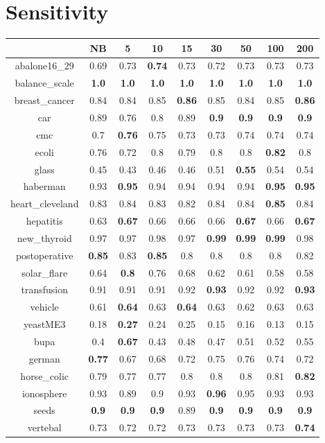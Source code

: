 \documentclass{article}%
\begin{document}
%
\section*{Sensitivity}%
\begin{tabular}{c|cccccccc}%
\hline%
&NB&5&10&15&30&50&100&200\\%
\hline%
abalone16\_29&0.69&0.73&\textbf{0.74}&0.73&0.72&0.73&0.73&0.73\\%
\hline%
balance\_scale&\textbf{1.0}&\textbf{1.0}&\textbf{1.0}&\textbf{1.0}&\textbf{1.0}&\textbf{1.0}&\textbf{1.0}&\textbf{1.0}\\%
\hline%
breast\_cancer&0.84&0.84&0.85&\textbf{0.86}&0.85&0.84&0.85&\textbf{0.86}\\%
\hline%
car&0.89&0.76&0.8&0.89&\textbf{0.9}&\textbf{0.9}&\textbf{0.9}&\textbf{0.9}\\%
\hline%
cmc&0.7&\textbf{0.76}&0.75&0.73&0.73&0.74&0.74&0.74\\%
\hline%
ecoli&0.76&0.72&0.8&0.79&0.8&0.8&\textbf{0.82}&0.8\\%
\hline%
glass&0.45&0.43&0.46&0.46&0.51&\textbf{0.55}&0.54&0.54\\%
\hline%
haberman&0.93&\textbf{0.95}&0.94&0.94&0.94&0.94&\textbf{0.95}&\textbf{0.95}\\%
\hline%
heart\_cleveland&0.83&0.84&0.83&0.82&0.84&0.84&\textbf{0.85}&0.84\\%
\hline%
hepatitis&0.63&\textbf{0.67}&0.66&0.66&0.66&\textbf{0.67}&0.66&\textbf{0.67}\\%
\hline%
new\_thyroid&0.97&0.97&0.98&0.97&\textbf{0.99}&\textbf{0.99}&\textbf{0.99}&0.98\\%
\hline%
postoperative&\textbf{0.85}&0.83&\textbf{0.85}&0.8&0.8&0.8&0.8&0.82\\%
\hline%
solar\_flare&0.64&\textbf{0.8}&0.76&0.68&0.62&0.61&0.58&0.58\\%
\hline%
transfusion&0.91&0.91&0.91&0.92&\textbf{0.93}&0.92&0.92&\textbf{0.93}\\%
\hline%
vehicle&0.61&\textbf{0.64}&0.63&\textbf{0.64}&0.63&0.62&0.63&0.63\\%
\hline%
yeastME3&0.18&\textbf{0.27}&0.24&0.25&0.15&0.16&0.13&0.15\\%
\hline%
bupa&0.4&\textbf{0.67}&0.43&0.48&0.47&0.51&0.52&0.55\\%
\hline%
german&\textbf{0.77}&0.67&0.68&0.72&0.75&0.76&0.74&0.72\\%
\hline%
horse\_colic&0.79&0.77&0.77&0.8&0.8&0.8&0.81&\textbf{0.82}\\%
\hline%
ionosphere&0.93&0.89&0.9&0.93&\textbf{0.96}&0.95&0.93&0.93\\%
\hline%
seeds&\textbf{0.9}&\textbf{0.9}&\textbf{0.9}&0.89&\textbf{0.9}&\textbf{0.9}&\textbf{0.9}&\textbf{0.9}\\%
\hline%
vertebal&0.73&0.72&0.72&0.73&0.73&0.73&0.73&\textbf{0.74}\\%
\hline%
\end{tabular}
\end{document}
